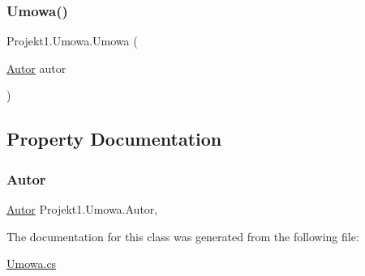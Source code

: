 \subsubsection{\texorpdfstring{Umowa()}{Umowa()}}
{\footnotesize\ttfamily Projekt1.\+Umowa.\+Umowa (\begin{DoxyParamCaption}\item[{\mbox{\hyperlink{class_projekt1_1_1_autor}{Autor}}}]{autor }\end{DoxyParamCaption})}



\subsection{Property Documentation}
\mbox{\label{class_projekt1_1_1_umowa_a117b9b3e033e48843fac7290234369f9}} 
\subsubsection{\texorpdfstring{Autor}{Autor}}
{\footnotesize\ttfamily \mbox{\hyperlink{class_projekt1_1_1_autor}{Autor}} Projekt1.\+Umowa.\+Autor\hspace{0.3cm}{\ttfamily [get]}, {}}



The documentation for this class was generated from the following file\+:\begin{DoxyCompactItemize}
\item 
\mbox{\hyperlink{_umowa_8cs}{Umowa.\+cs}}\end{DoxyCompactItemize}

